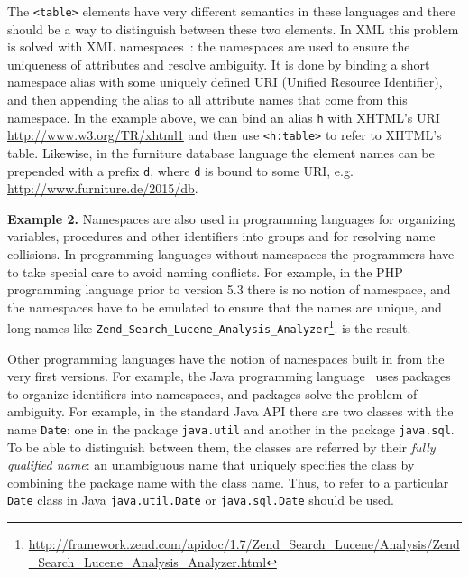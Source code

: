 The \verb|<table>| elements have very different semantics in these languages
and there should be a way to distinguish between these two elements.
In XML this problem is solved with XML namespaces~\cite{xmlnamespaces}:
the namespaces are used to ensure the uniqueness of attributes and resolve ambiguity.
It is done by binding a short namespace alias with some uniquely defined URI
(Unified Resource Identifier), and then appending the alias to
all attribute names that come from this namespace. In the example above,
we can bind an alias \verb|h| with XHTML's URI \url{http://www.w3.org/TR/xhtml1}
and then use \verb|<h:table>| to refer to XHTML's table. Likewise,
in the furniture database language the element names can be prepended
with a prefix \verb|d|, where \verb|d| is bound to some URI, e.g.
\url{http://www.furniture.de/2015/db}.




\textbf{Example 2.} Namespaces are also used in programming languages for organizing
variables, procedures and other identifiers into groups and
for resolving name collisions. In programming languages without
namespaces the programmers have to take special care to avoid
naming conflicts. For example, in the PHP programming language
prior to version 5.3 \cite{mcarthur2008php6} there is no notion of namespace, and
the namespaces have to be emulated to ensure that the names
are unique, and long names like
\verb|Zend_Search_Lucene_Analysis_Analyzer|\footnote{\url{http://framework.zend.com/apidoc/1.7/Zend_Search_Lucene/Analysis/Zend_Search_Lucene_Analysis_Analyzer.html}}.
is the result.

Other programming languages have the notion of namespaces built in
from the very first versions. For example, the Java programming
language~\cite{gosling2014java} uses packages to organize identifiers into
namespaces, and packages solve the problem of ambiguity. For example,
in the standard Java API there are two classes with the name \texttt{Date}:
one in the package \texttt{java.util} and another in the package \texttt{java.sql}.
To be able to distinguish between them, the classes are referred by their
\emph{fully qualified name}: an unambiguous name that uniquely specifies the class
by combining the package name with the class name. Thus, to refer to a particular
\texttt{Date} class in Java  \texttt{java.util.Date} or  \texttt{java.sql.Date}
should be used.

